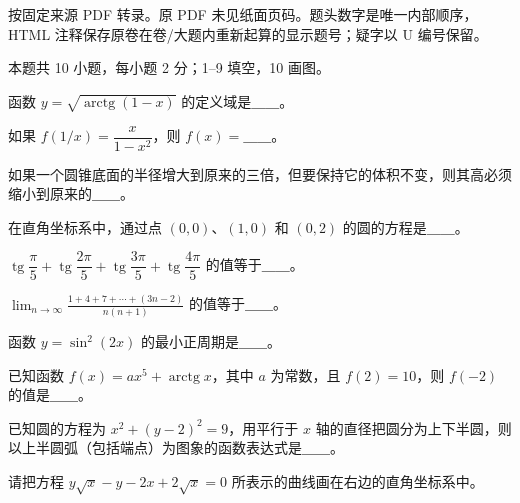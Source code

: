 

\begin{gktip}
按固定来源 PDF 转录。原 PDF 未见纸面页码。题头数字是唯一内部顺序，HTML 注释保存原卷在卷/大题内重新起算的显示题号；疑字以 U 编号保留。
\end{gktip}


本题共 10 小题，每小题 2 分；1–9 填空，10 画图。

\begin{question}
函数 $y=\sqrt{\operatorname{arctg}(1-x)}$ 的定义域是＿＿。

\end{question}
\begin{question}
如果 $f(1/x)=\dfrac{x}{1-x^2}$，则 $f(x)=$＿＿。

\end{question}
\begin{question}
如果一个圆锥底面的半径增大到原来的三倍，但要保持它的体积不变，则其高必须缩小到原来的＿＿。

\end{question}
\begin{question}
在直角坐标系中，通过点 $(0,0)$、$(1,0)$ 和 $(0,2)$ 的圆的方程是＿＿。

\end{question}
\begin{question}
$\operatorname{tg}\dfrac\pi5+\operatorname{tg}\dfrac{2\pi}5+\operatorname{tg}\dfrac{3\pi}5+\operatorname{tg}\dfrac{4\pi}5$ 的值等于＿＿。

\end{question}
\begin{question}
$\displaystyle\lim_{n\to\infty}\frac{1+4+7+\cdots +(3n-2)}{n(n+1)}$ 的值等于＿＿。

\end{question}
\begin{question}
函数 $y=\sin^2(2x)$ 的最小正周期是＿＿。

\end{question}
\begin{question}
已知函数 $f(x)=ax^5+\operatorname{arctg}x$，其中 $a$ 为常数，且 $f(2)=10$，则 $f(-2)$ 的值是＿＿。

\end{question}
\begin{question}
已知圆的方程为 $x^2+(y-2)^2=9$，用平行于 $x$ 轴的直径把圆分为上下半圆，则以上半圆弧（包括端点）为图象的函数表达式是＿＿。

\Needspace{0.4\textheight}
\end{question}
\begin{question}
请把方程 $y\sqrt{x}-y-2x+2\sqrt{x}=0$ 所表示的曲线画在右边的直角坐标系中。
\nopagebreak[4]
\begin{center}\end{center}
\nopagebreak[4]
\end{question}

